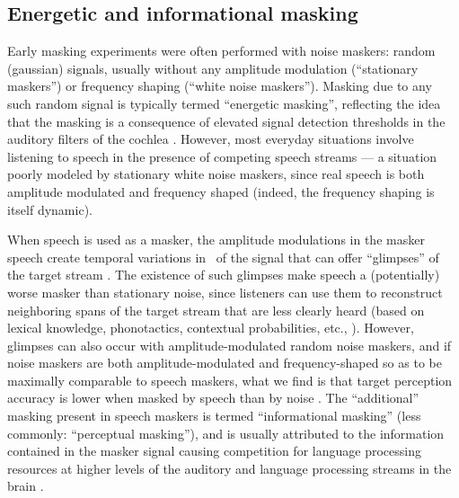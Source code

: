 \subsection{Energetic and informational masking}
Early masking experiments \citep[e.g.,][]{HawkinsStevens1950,Tolhurst1957b,PollackPickett1958} were often performed with noise maskers: random (gaussian) signals, usually without any amplitude modulation (“stationary maskers”) or frequency shaping (“white noise maskers”).  Masking due to any such random signal is typically termed “energetic masking”, reflecting the idea that the masking is a consequence of elevated signal detection thresholds in the auditory filters of the cochlea \citep{DurlachEtAl2003,xxx}.  However, most everyday situations involve listening to speech in the presence of competing speech streams — a situation poorly modeled by stationary white noise maskers, since real speech is both amplitude modulated and frequency shaped (indeed, the frequency shaping is itself dynamic).  

When speech is used as a masker, the amplitude modulations in the masker speech create temporal variations in \snr\ of the signal that can offer “glimpses” of the target stream \citep{FestenPlomp1990}.  The existence of such glimpses make speech a (potentially) worse masker than stationary noise, since listeners can use them to reconstruct neighboring spans of the target stream that are less clearly heard (based on lexical knowledge, phonotactics, contextual probabilities, etc., \citep{xxx}).  However, glimpses can also occur with amplitude-modulated random noise maskers, and if noise maskers are both amplitude-modulated and frequency-shaped so as to be maximally comparable to speech maskers, what we find is that target perception accuracy is lower when masked by speech than by noise \citep[e.g.,][]{CarhartEtAl1969,LewisEtAl1988,SimpsonCooke2005}.  The “additional” masking present in speech maskers is termed “informational masking” (less commonly: “perceptual masking”), and is usually attributed to the information contained in the masker signal causing competition for language processing resources at higher levels of the auditory and language processing streams in the brain \citep{DurlachEtAl2003,xxx}.

